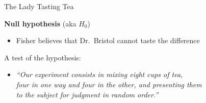 \documentclass[10pt,xcolor=table,ignorenonframetext,handout,aspectratio=169]{beamer}
\newlength{\wideitemsep}
\let\olditem\item
\renewcommand{\item}{\setlength{\itemsep}{\wideitemsep}\olditem}
\begin{document}

\begin{frame}{The Lady Tasting Tea}

%


\medskip
\textbf{Null hypothesis} (aka $H_0$)

\medskip
\begin{itemize}
	
	
	\item Fisher believes that Dr.~Bristol cannot taste the difference
	
\end{itemize}

\pause
\medskip
\medskip
A test of the hypothesis:

\medskip
\begin{itemize}
	
	
	\item
	\emph{``Our experiment consists in mixing eight cups of tea, \\
		four in one way and four in the other, and presenting them \\
		to the subject for judgment in random order.''}
	
\end{itemize}

\end{frame}


\end{document}
